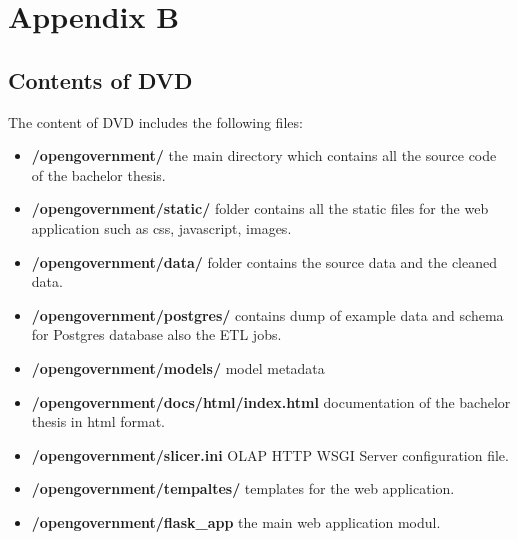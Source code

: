 \documentclass[letterpaper,12pt,oneside]{sphinxmanual}
\begin{document}
\chapter{Appendix B}
\label{appendixb::doc}\label{appendixb:appendix-b}

\section{Contents of DVD}
\label{appendixb:contents-of-dvd}
The content of DVD includes the following files:
\begin{itemize}
\item {} 
\textbf{/opengovernment/} the main directory which contains all the source code of the bachelor thesis.

\item {} 
\textbf{/opengovernment/static/} folder contains all the static files for the web application such as css, javascript, images.

\item {} 
\textbf{/opengovernment/data/} folder contains the source data and the cleaned data.

\item {} 
\textbf{/opengovernment/postgres/} contains dump of example data and schema for Postgres database also the ETL jobs.

\item {} 
\textbf{/opengovernment/models/} model metadata

\item {} 
\textbf{/opengovernment/docs/html/index.html} documentation of the bachelor thesis in html format.

\item {} 
\textbf{/opengovernment/slicer.ini} OLAP HTTP WSGI Server configuration file.

\item {} 
\textbf{/opengovernment/tempaltes/} templates for the web application.

\item {} 
\textbf{/opengovernment/flask\_app} the main web application modul.

\end{itemize}

\begin{thebibliography}{workspace}
\end{thebibliography}



\renewcommand{\indexname}{Index}
\printindex
\end{document}
